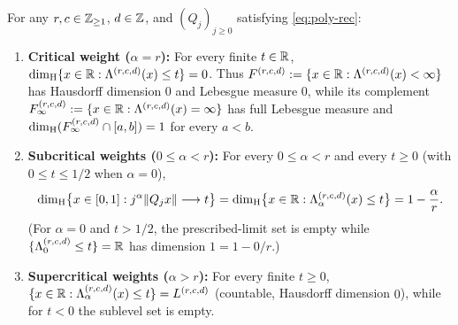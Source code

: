 \begin{theorem}\label{thm:poly-phase-transition}
For any $r,c\in\mathbb{Z}_{\ge1}$, $d\in\mathbb{Z}$, and $(Q_j)_{j\ge0}$ satisfying \eqref{eq:poly-rec}:
\begin{enumerate}[label=(\roman*),leftmargin=2em]
\item \textbf{Critical weight ($\alpha=r$):} For every finite $t\in\mathbb{R}$,
$\dim_{\mathrm{H}}\{x\in\mathbb{R}:\Lambda^{(r,c,d)}(x)\le t\}=0$. Thus
$F^{(r,c,d)}:=\{x\in\mathbb{R}:\Lambda^{(r,c,d)}(x)<\infty\}$ has Hausdorff dimension $0$
and Lebesgue measure $0$, while its complement
$F_\infty^{(r,c,d)}:=\{x\in\mathbb{R}:\Lambda^{(r,c,d)}(x)=\infty\}$ has full Lebesgue
measure and $\dim_{\mathrm{H}}(F_\infty^{(r,c,d)}\cap[a,b])=1$ for every $a<b$.
\item \textbf{Subcritical weights ($0\le\alpha<r$):} For every $0\le\alpha<r$ and
every $t\ge0$ (with $0\le t\le1/2$ when $\alpha=0$),
\[
\dim_{\mathrm{H}}\bigl\{x\in[0,1]:j^\alpha\|Q_jx\|\longrightarrow t\bigr\}
=\dim_{\mathrm{H}}\bigl\{x\in\mathbb{R}:\Lambda_\alpha^{(r,c,d)}(x)\le t\bigr\}
=1-\frac{\alpha}{r}.
\]
(For $\alpha=0$ and $t>1/2$, the prescribed-limit set is empty while
$\{\Lambda_0^{(r,c,d)}\le t\}=\mathbb{R}$ has dimension $1=1-0/r$.)
\item \textbf{Supercritical weights ($\alpha>r$):} For every finite $t\ge0$,
$\{x\in\mathbb{R}:\Lambda_\alpha^{(r,c,d)}(x)\le t\}=L^{(r,c,d)}$ (countable, Hausdorff
dimension $0$), while for $t<0$ the sublevel set is empty.
\end{enumerate}
\end{theorem}

